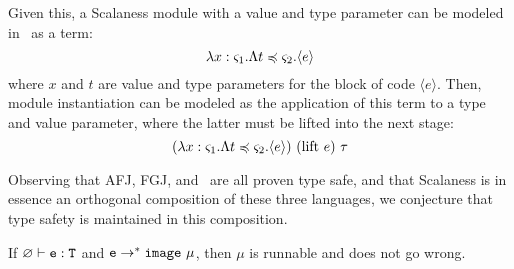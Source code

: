 Given this, a Scalaness module with a value and type parameter can be modeled in \fml\ as a
term:
$$\lambda x : \s_1 . \Lambda t \subtype \s_2 . \langle e \rangle$$
where $x$ and $t$ are value and type parameters for the block of code $\langle e \rangle$. Then,
module instantiation can be modeled as the application of this term to a type and value
parameter, where the latter must be lifted into the next stage:
$$
(\lambda x : \s_1 . \Lambda t \subtype \s_2 . \langle e \rangle)\ (\mathrm{lift}\ e)\ \t
$$ 

Observing that AFJ, FGJ, and \fml\ are all proven type safe, and that Scalaness is in essence an
orthogonal composition of these three languages, we conjecture that type safety is maintained in
this composition.

\begin{conject}
  If $\varnothing \vdash \tt{e} : \tt{T}$ and $\tt{e} \rightarrow^* \jimage{\mu}$, then $\mu$ is
  runnable and does not go wrong.
\end{conject}

